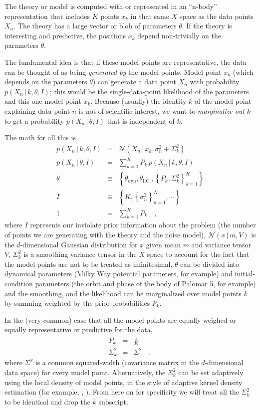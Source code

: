 \documentclass[12pt,pdftex,preprint]{aastex}
\newcommand{\setof}[1]{\left\{{#1}\right\}}
\newcommand{\given}{\,|\,}
\newcommand{\dyn}{\mathrm{dyn}}
\newcommand{\ic}{\mathrm{I.C.}}
\newcommand{\normal}{\mathscr{N}}
\begin{document}
The theory or model is computed with or represented in an ``n-body''
representation that includes $K$ points $x_k$ in that same $X$ space
as the data points $X_n$.  The theory has a large vector or blob of
parameters $\theta$.  If the theory is interesting and predictive, the
positions $x_k$ depend non-trivially on the parameters $\theta$.

The fundamental idea is that if these model points are representative,
the data can be thought of as being \emph{generated by} the model
points.  Model point $x_k$ (which depends on the parameters $\theta$)
can generate a data point $X_n$ with probability $p(X_n\given
k,\theta,I)$; this would be the single-data-point likelihood of the
parameters and this one model point $x_k$.  Because (usually) the
identity $k$ of the model point explaining data point $n$ is not of
scientific interest, we want to \emph{marginalize out} $k$ to get a
probability $p(X_n\given\theta,I)$ that is independent of $k$.

The math for all this is
\begin{eqnarray}
p(X_n\given k,\theta,I) &=& \normal(X_n\given x_k,\sigma^2_n+\Sigma_k^2)
\\
p(X_n\given\theta,I) &=& \sum_{k=1}^K P_k\,p(X_n\given k,\theta,I)
\\
\theta &\equiv& \setof{\theta_\dyn, \theta_\ic, \setof{P_k, \Sigma_k^2}_{k=1}^K }
\\
I &\equiv& \setof{K, \setof{\sigma^2_n}_{n=1}^N, \cdots}
\\
1 &=& \sum_{k=1}^K P_k
\quad ,
\end{eqnarray}
where $I$ represents our inviolate prior information about the problem
(the number of points we are generating with the theory and the noise
model), $\normal(x\given m, V)$ is the $d$-dimensional Gaussian
distribution for $x$ given mean $m$ and variance tensor $V$,
$\Sigma^2_k$ is a smoothing variance tensor in the $X$ space to
account for the fact that the model points are not to be treated as
infinitesimal, $\theta$ can be divided into dynamical parameters
(Milky Way potential parameters, for example) and initial-condition
parameters (the orbit and phase of the body of Palomar 5, for example)
and the smoothing, and the likelihood can be marginalized over model
points $k$ by summing weighted by the prior probabilities $P_k$.

In the (very common) case that all the model points are
equally weighed or equally representative or predictive for the data,
\begin{eqnarray}
P_k &=& \frac{1}{K}
\\
\Sigma^2_k &=& \Sigma^2
\quad ,
\end{eqnarray}
where $\Sigma^2$ is a common squared-width (covariance matrix in the
$d$-dimensional data space) for every model point.  Alternatively, the
$\Sigma^2_k$ can be set adaptively using the local density of model
points, in the style of adaptive kernel density estimation (for
example, \citealt{adaptiveKDE1}, \citealt{adaptiveKDE2}).  From here
on for specificity we will treat all the $\Sigma^2_k$ to be identical
and drop the $k$ subscript.
\end{document}
